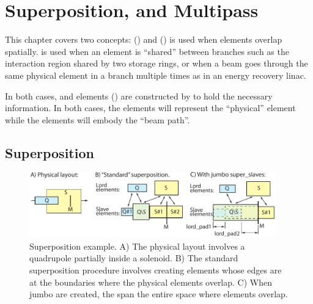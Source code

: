 \chapter{Superposition, and Multipass}
\label{c:super.multi}

This chapter covers two concepts:  ()
and  ()  is used
when elements overlap spatially.   is used when an
element is ``shared'' between branches such as the interaction region
shared by two storage rings, or when a beam goes through the same
physical element in a branch multiple times as in an energy recovery
linac.

In both cases,  and  elements ()
are constructed by \bmad to hold the necessary information. In both
cases, the  elements will represent the ``physical'' element
while the  elements will embody the ``beam path''.

\section{Superposition}
\label{s:super}

  \begin{figure}[tb]
  \centering 
  \includegraphics[width=0.95\textwidth]{superimpose-example.pdf} 
  \caption[Superposition example.]
{Superposition example. A) The physical layout involves a quadrupole
partially inside a solenoid. B) The standard superposition procedure
involves creating  elements whose edges are at the
boundaries where the physical elements overlap. C) When jumbo
 are created, the  span the entire
space where elements overlap.}
  \label{f:super.ex}
  \end{figure}

